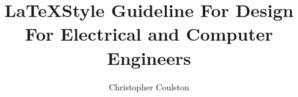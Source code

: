 \documentclass[letterpaper, 10pt]{memoir}
\begin{document}
\frontmatter
\title{\LaTeX Style Guideline For Design For Electrical and Computer Engineers} 
\author{Christopher Coulston}
\date{}

\maketitle

\tableofcontents

\mainmatter 


\hideanswers


\printindex
\end{document}
